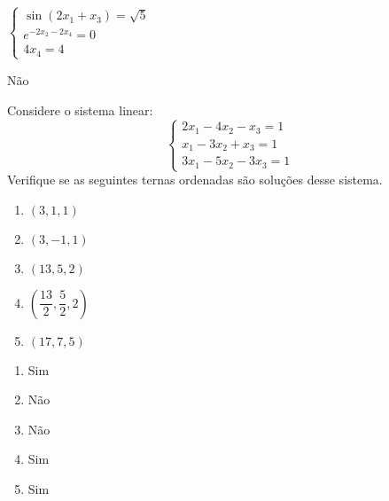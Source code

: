 \documentclass[12pt]{exam}
\begin{document}
\begin{exercicio}\label{fimesistemalinearsimples}
    $\begin{cases} \sin(2x_1 + x_3) = \sqrt{5}\\ e^{-2x_2 - 2x_4} = 0\\ 4x_4 = 4\end{cases}$
    \begin{solucao}
        Não
    \end{solucao}
\end{exercicio}

\begin{exercicio}
  Considere o sistema linear:
  \[
    \begin{cases}
      2x_1 - 4x_2 - x_3 = 1\\
      x_1 - 3x_2 + x_3 = 1\\
      3x_1 - 5x_2 - 3x_3 = 1
    \end{cases}
  \]
  Verifique se as seguintes ternas ordenadas são soluções desse sistema.
  \begin{enumerate}[label={\alph*})]
    \item $(3,1,1)$
    \item $(3,-1,1)$
    \item $(13, 5, 2)$
    \item $\left(\dfrac{13}{2}, \dfrac{5}{2}, 2\right)$
    \item $(17,7,5)$
  \end{enumerate}
  \begin{solucao}
    \begin{enumerate}[label={\alph*})]
      \item Sim
      \item Não
      \item Não
      \item Sim
      \item Sim
    \end{enumerate}
  \end{solucao}
\end{exercicio}
\end{document}
